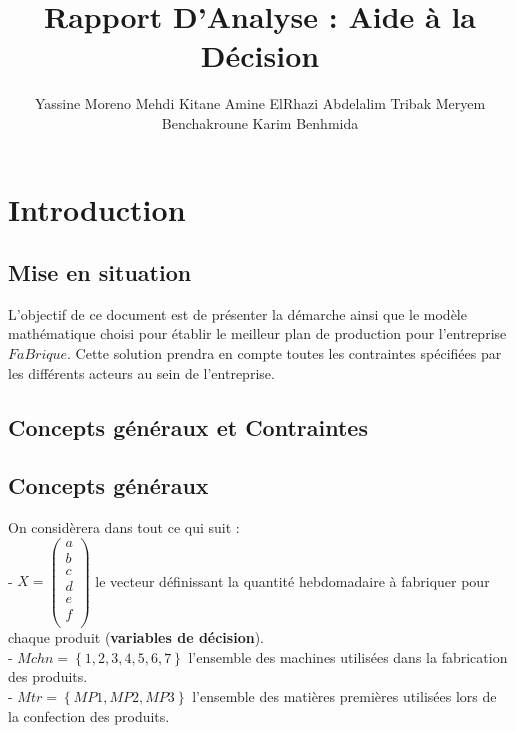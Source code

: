 \documentclass[a4paper, 11pt]{article}
\title{Rapport D'Analyse : Aide à la Décision}
\author{Yassine Moreno \cr Mehdi Kitane \cr Amine ElRhazi \cr Abdelalim Tribak \cr Meryem Benchakroune \cr Karim Benhmida}
\begin{document}
\begin{LARGE}
\maketitle
\end{LARGE}

\tableofcontents
\newpage

\section{Introduction}
\subsection{Mise en situation}
L'objectif de ce document est de présenter la démarche ainsi que le modèle mathématique choisi pour établir le meilleur plan de production pour l'entreprise $FaBrique$. Cette solution prendra en compte toutes les contraintes spécifiées par les différents acteurs au sein de l'entreprise. 
\subsection{Concepts généraux et Contraintes}
\subsection*{Concepts généraux}
On considèrera dans tout ce qui suit : \\
- $X = \begin{pmatrix}
        a\\
        b\\
        c\\
        d\\
        e\\
        f\\
    \end{pmatrix}$ le vecteur définissant la quantité hebdomadaire à fabriquer pour chaque produit (\textbf{variables de décision}).\\
- $Mchn = \left\{1, 2, 3, 4, 5, 6, 7\right\}$ l'ensemble des machines utilisées dans la fabrication des produits.\\
- $Mtr = \left\{MP1,MP2,MP3\right\}$ l'ensemble des matières premières utilisées lors de la confection des produits.
\end{document}
